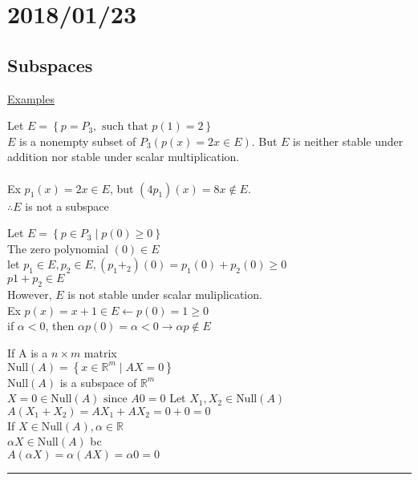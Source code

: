 \documentclass[12pt]{article}
\newcommand{\real}[0]{\mathbb{R}}
\newenvironment{proof}{\block[Proof]}{\endblock}
\newenvironment{examples}{\shownto{-,compact}\underline{Examples}\enumerate}{\endenumerate\divider\endshownto}
\newcommand{\bb}[1]{\left\{#1\right\}}
\newcommand{\divider}[0]{\textcolor{lightgray}{\rule{\textwidth}{0.1pt}}}
\begin{document}
\section{2018/01/23}

\subsection{Subspaces}

\begin{examples}
	\item Let $E = \bb{p = P_3, \text{ such that } p(1) = 2}$ \\
	$E$ is a nonempty subset of $P_3 (p(x) = 2x \in E)$. But $E$ is neither stable under addition nor stable under scalar multiplication. \\\\
	Ex $p_1(x) = 2x \in E$, but $(4p_1)(x) = 8x \notin E$. \\
	$\therefore E$ is not a subspace 
	
	\item Let $E = \bb{p \in P_3 \mid p(0) \ge 0}$ \\
	The zero polynomial $(0) \in E$ \\
	let $p_1 \in E, p_2 \in E, (p_1 + _2)(0) = p_1(0) + p_2(0) \ge 0$ \\
	$p1 + p_2 \in E$ \\
	However, $E$ is not stable under scalar muliplication. \\
	Ex $p(x) = x + 1 \in E \leftarrow p(0) = 1 \ge 0$ \\
	if $\alpha < 0$, then $\alpha p(0) = \alpha < 0 \rightarrow \alpha p \notin E$
	
	\item If A is a $n \times m$ matrix \\
	$\text{Null}(A) = \bb{x \in \real^m \mid AX = 0}$ \\
	$\text{Null}(A)$ is a subspace of $\real^m$ \\
	\begin{proof}
		$X = 0 \in \text{Null}(A) \text{ since } A0 = 0$
		Let $X_1, X_2 \in \text{Null}(A)$ \\
		$A(X_1 + X_2) = AX_1 + AX_2 = 0 + 0 = 0$ \\
		If $X \in \text{Null}(A), \alpha \in \real$ \\
		$\alpha X \in \text{Null}(A)$ bc \\
		$A(\alpha X) = \alpha (AX) = \alpha 0 = 0$
	\end{proof}
\end{examples}
\end{document}
